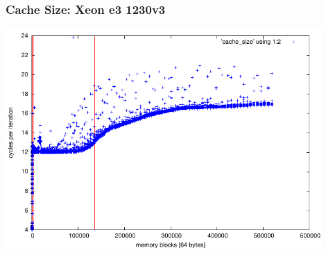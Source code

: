 \documentclass{beamer}
\begin{document}
\begin{frame}[fragile]
	\frametitle{Cache Size: Xeon e3 1230v3}
	\includegraphics[width=0.9\textwidth]{../xeon_e3_1230v3/cache_size_all.pdf}
\end{frame}
\end{document}

